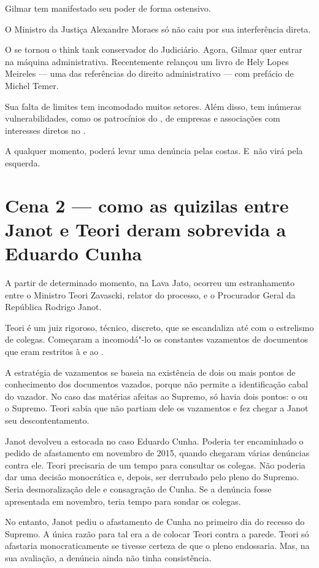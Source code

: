 Gilmar tem manifestado seu poder de forma ostensivo.

O Ministro da Justiça Alexandre Moraes só não caiu por sua interferência
direta.

O  se tornou o think tank conservador do Judiciário. Agora, Gilmar
quer entrar na máquina administrativa. Recentemente relançou um livro de
Hely Lopes Meireles --- uma das referências do direito administrativo
--- com prefácio de Michel Temer.

Sua falta de limites tem incomodado muitos setores. Além disso, tem
inúmeras vulnerabilidades, como os patrocínios do , de empresas e
associações com interesses diretos no .

A qualquer momento, poderá levar uma denúncia pelas costas. E~não virá
pela esquerda.

 

\section{Cena 2 --- como as quizilas entre Janot e Teori deram sobrevida
a Eduardo Cunha}

A partir de determinado momento, na Lava Jato, ocorreu um estranhamento
entre o Ministro Teori Zavascki, relator do processo, e o Procurador
Geral da República Rodrigo Janot.

Teori é um juiz rigoroso, técnico, discreto, que se escandaliza até com
o estrelismo de colegas. Começaram a incomodá"-lo os constantes
vazamentos de documentos que eram restritos à  e ao .

A estratégia de vazamentos se baseia na existência de dois ou mais
pontos de conhecimento dos documentos vazados, porque não permite a
identificação cabal do vazador. No caso das matérias afeitas ao Supremo,
só havia dois pontos: o  ou o Supremo. Teori sabia que não partiam
dele os vazamentos e fez chegar a Janot seu descontentamento.

Janot devolveu a estocada no caso Eduardo Cunha. Poderia ter encaminhado
o pedido de afastamento em novembro de 2015, quando chegaram várias
denúncias contra ele. Teori precisaria de um tempo para consultar os
colegas. Não poderia dar uma decisão monocrática e, depois, ser
derrubado pelo pleno do Supremo. Seria desmoralização dele e consagração
de Cunha. Se a denúncia fosse apresentada em novembro, teria tempo para
sondar os colegas.

No entanto, Janot pediu o afastamento de Cunha no primeiro dia do
recesso do Supremo. A única razão para tal era a de colocar Teori contra
a parede. Teori só afastaria monocraticamente se tivesse certeza de que
o pleno endossaria. Mas, na sua avaliação, a denúncia ainda não tinha
consistência.

